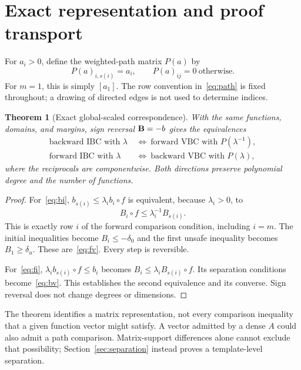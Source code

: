 \documentclass[5p,times]{elsarticle}
\newtheorem{theorem}{Theorem}
\theoremstyle{definition}\newtheorem{definition}[theorem]{Definition}
\theoremstyle{remark}\newtheorem{remark}[theorem]{Remark}
\begin{document}
\section{Exact representation and proof transport}
For $a_i>0$, define the weighted-path matrix $P(a)$ by
\begin{equation}\label{eq:path}
 P(a)_{i,s(i)}=a_i,\qquad P(a)_{ij}=0\ \text{otherwise}.
\end{equation}
For $m=1$, this is simply $[a_1]$. The row convention in~\eqref{eq:path} is fixed throughout; a drawing of directed edges is not used to determine indices.

\begin{theorem}[Exact global-scaled correspondence]\label{thm:embedding}
With the same functions, domains, and margins, sign reversal $\mathbf B=-b$ gives the equivalences
\begin{align*}
 \text{backward IBC with }\lambda
 &\ \Longleftrightarrow\ \text{forward VBC with }P(\lambda^{-1}),\\
 \text{forward IBC with }\lambda
 &\ \Longleftrightarrow\ \text{backward VBC with }P(\lambda),
\end{align*}
where the reciprocals are componentwise. Both directions preserve polynomial degree and the number of functions.
\end{theorem}
\begin{proof}
For~\eqref{eq:bi}, $b_{s(i)}\le\lambda_i b_i\circ f$ is equivalent, because $\lambda_i>0$, to
\[
 B_i\circ f\le\lambda_i^{-1}B_{s(i)}.
\]
This is exactly row $i$ of the forward comparison condition, including $i=m$. The initial inequalities become $B_i\le-\delta_0$ and the first unsafe inequality becomes $B_1\ge\delta_u$. These are~\eqref{eq:fv}. Every step is reversible.

For~\eqref{eq:fi}, $\lambda_i b_{s(i)}\circ f\le b_i$ becomes $B_i\le\lambda_i B_{s(i)}\circ f$. Its separation conditions become~\eqref{eq:bv}. This establishes the second equivalence and its converse. Sign reversal does not change degrees or dimensions.
\end{proof}

The theorem identifies a matrix representation, not every comparison inequality that a given function vector might satisfy. A vector admitted by a dense $A$ could also admit a path comparison. Matrix-support differences alone cannot exclude that possibility; Section~\ref{sec:separation} instead proves a template-level separation.
\end{document}

